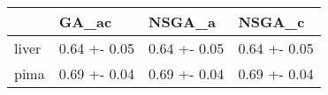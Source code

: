 \begin{tabular}{llll}
\toprule
{} &         GA\_ac &        NSGA\_a &        NSGA\_c \\
\midrule
liver &  0.64 +- 0.05 &  0.64 +- 0.05 &  0.64 +- 0.05 \\
pima  &  0.69 +- 0.04 &  0.69 +- 0.04 &  0.69 +- 0.04 \\
\bottomrule
\end{tabular}

